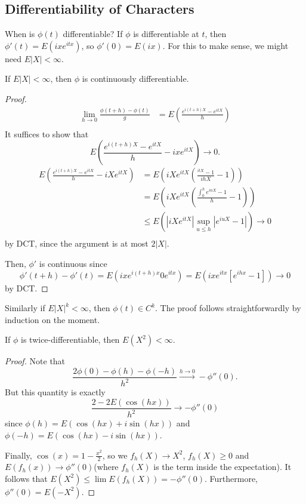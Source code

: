 \documentclass[11pt]{scrartcl}
\begin{document}
\subsection{Differentiability of Characters}
When is $\phi(t)$ differentiable?  If $\phi$ is differentiable at $t$, then $\phi'(t) = E(ix e^{itx})$, so $\phi'(0) = E(ix)$.  For this to make sense, we might need $E|X| < \infty$.
\begin{thm} If $E|X| < \infty$, then $\phi$ is continuously differentiable.   
\end{thm}
\begin{proof}
\begin{align*}
\lim_{h \rightarrow 0} \frac{\phi(t+h) - \phi(t)}{g} &= E\left (\frac{e^{i(t+h)X} - e^{itX}}{h}\right ) \\
\end{align*}
It suffices to show that $$E\left (\frac{e^{i(t+h)X} - e^{itX}}{h} - ixe^{itX}\right ) \rightarrow 0.$$
\begin{align*}
E\left (\frac{e^{i(t+h)X} - e^{itX}}{h}  - iXe^{itX}\right) &= E(iXe^{itX}(\frac{^{itX}-1}{ihX} - 1 )) \\
&= E\left (iXe^{itX}\left ( \frac{\int_0^h e^{inX} - 1 }{h} - 1\right )\right )\\ 
&\le E(|iXe^{itX}| \sup_{u\le h} |e^{iuX} - 1| ) \rightarrow 0 \\
\end{align*}
by DCT, since the argument is at most $2|X|$.

Then, $\phi'$ is continuous since $$\phi'(t+h) - \phi'(t) = E(ixe^{i(t+h)x} 0 e^{itx}) = E(ixe^{itx}[e^{ihx} - 1]) \rightarrow 0$$
by DCT.
\end{proof}
Similarly if $E|X|^k < \infty$, then $\phi(t) \in C^k$.  The proof follows straightforwardly by induction on the moment.
\begin{lemma} If $\phi$ is twice-differentiable, then $E(X^2) < \infty$.
\end{lemma}
\begin{proof}
Note that 
$$\frac{2\phi(0) - \phi(h) - \phi(-h)}{h^2} \xrightarrow{h \rightarrow 0} -\phi''(0).$$
But this quantity is exactly
$$\frac{2 - 2E(\cos(hx))}{h^2} \to -\phi''(0)$$
since $\phi(h) = E(\cos(hx) + i\sin(hx))$ and $\phi(-h) = E(\cos(hx) - i\sin(hx))$.

Finally, $\cos(x) = 1 - \frac{x^2}{2}$, so we $f_h(X) \rightarrow X^2$, $f_h(X) \ge 0$ and $E(f_h(x)) \rightarrow \phi''(0)$(where $f_h(X)$ is the term inside the expectation).  It follows that $E(X^2) \le \lim E(f_h(X)) = -\phi''(0)$.   Furthermore, $\phi''(0) = E(-X^2)$.
\end{proof}
\end{document}
